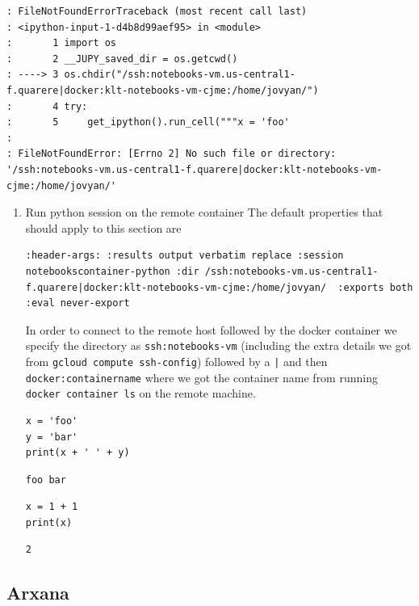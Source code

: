 \documentclass[11pt]{article}
\begin{document}
\begin{verbatim}
: FileNotFoundErrorTraceback (most recent call last)
: <ipython-input-1-d4b8d99aef95> in <module>
:       1 import os
:       2 __JUPY_saved_dir = os.getcwd()
: ----> 3 os.chdir("/ssh:notebooks-vm.us-central1-f.quarere|docker:klt-notebooks-vm-cjme:/home/jovyan/")
:       4 try:
:       5     get_ipython().run_cell("""x = 'foo'
:
: FileNotFoundError: [Errno 2] No such file or directory: '/ssh:notebooks-vm.us-central1-f.quarere|docker:klt-notebooks-vm-cjme:/home/jovyan/'
\end{verbatim}

\begin{enumerate}
\item Run python session on the remote container
\label{sec:org32066e2}
The default properties that should apply to this section are

\begin{verbatim}
:header-args: :results output verbatim replace :session notebookscontainer-python :dir /ssh:notebooks-vm.us-central1-f.quarere|docker:klt-notebooks-vm-cjme:/home/jovyan/  :exports both  :eval never-export
\end{verbatim}

In order to connect to the remote host followed by the docker container we specify the directory as \texttt{ssh:notebooks-vm} (including the extra details we got from \texttt{gcloud compute ssh-config}) followed by a \texttt{|} and then \texttt{docker:containername} where we got the container name from running \texttt{docker container ls} on the remote machine.

\begin{verbatim}
x = 'foo'
y = 'bar'
print(x + ' ' + y)
\end{verbatim}

\begin{verbatim}
foo bar
\end{verbatim}


\begin{verbatim}
x = 1 + 1
print(x)
\end{verbatim}

\begin{verbatim}
2
\end{verbatim}
\end{enumerate}
\subsection{Arxana}
\label{sec:orge0a6a31}
\end{document}

